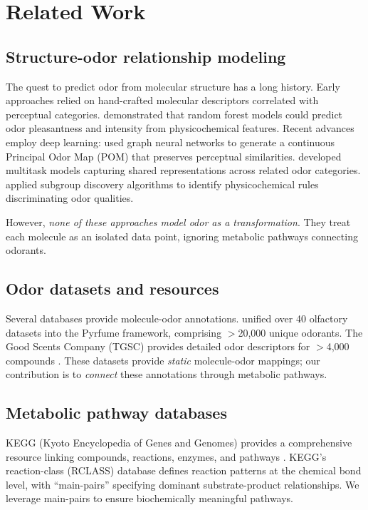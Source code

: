 \documentclass[a4paper,fleqn]{cas-sc}
\begin{document}
\section{Related Work}\label{sec:related}

\subsection{Structure-odor relationship modeling}

The quest to predict odor from molecular structure has a long history. Early approaches relied on hand-crafted molecular descriptors correlated with perceptual categories. \citet{Keller2017} demonstrated that random forest models could predict odor pleasantness and intensity from physicochemical features. Recent advances employ deep learning: \citet{Lee2023} used graph neural networks to generate a continuous Principal Odor Map (POM) that preserves perceptual similarities. \citet{Song2025} developed multitask models capturing shared representations across related odor categories. \citet{Chacko2019} applied subgroup discovery algorithms to identify physicochemical rules discriminating odor qualities.

However, \emph{none of these approaches model odor as a transformation}. They treat each molecule as an isolated data point, ignoring metabolic pathways connecting odorants.

\subsection{Odor datasets and resources}

Several databases provide molecule-odor annotations. \citet{Sharma2024} unified over 40 olfactory datasets into the Pyrfume framework, comprising $>$20,000 unique odorants. The Good Scents Company (TGSC) provides detailed odor descriptors for $>$4,000 compounds \citep{TGSC2024}. These datasets provide \emph{static} molecule-odor mappings; our contribution is to \emph{connect} these annotations through metabolic pathways.

\subsection{Metabolic pathway databases}

KEGG (Kyoto Encyclopedia of Genes and Genomes) provides a comprehensive resource linking compounds, reactions, enzymes, and pathways \citep{Kanehisa2021}. KEGG's reaction-class (RCLASS) database defines reaction patterns at the chemical bond level, with ``main-pairs'' specifying dominant substrate-product relationships. We leverage main-pairs to ensure biochemically meaningful pathways.
\end{document}
